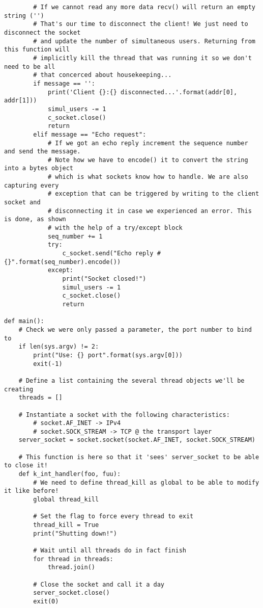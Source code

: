 \documentclass[landscape]{article}
\begin{document}
\begin{verbatim}
        # If we cannot read any more data recv() will return an empty string ('')
        # That's our time to disconnect the client! We just need to disconnect the socket
        # and update the number of simultaneous users. Returning from this function will
        # implicitly kill the thread that was running it so we don't need to be all
        # that concerced about housekeeping...
        if message == '':
            print('Client {}:{} disconnected...'.format(addr[0], addr[1]))
            simul_users -= 1
            c_socket.close()
            return
        elif message == "Echo request":
            # If we got an echo reply increment the sequence number and send the message.
            # Note how we have to encode() it to convert the string into a bytes object
            # which is what sockets know how to handle. We are also capturing every
            # exception that can be triggered by writing to the client socket and
            # disconnecting it in case we experienced an error. This is done, as shown
            # with the help of a try/except block
            seq_number += 1
            try:
                c_socket.send("Echo reply # {}".format(seq_number).encode())
            except:
                print("Socket closed!")
                simul_users -= 1
                c_socket.close()
                return

def main():
    # Check we were only passed a parameter, the port number to bind to
    if len(sys.argv) != 2:
        print("Use: {} port".format(sys.argv[0]))
        exit(-1)

    # Define a list containing the several thread objects we'll be creating
    threads = []

    # Instantiate a socket with the following characteristics:
        # socket.AF_INET -> IPv4
        # socket.SOCK_STREAM -> TCP @ the transport layer
    server_socket = socket.socket(socket.AF_INET, socket.SOCK_STREAM)

    # This function is here so that it 'sees' server_socket to be able to close it!
    def k_int_handler(foo, fuu):
        # We need to define thread_kill as global to be able to modify it like before!
        global thread_kill

        # Set the flag to force every thread to exit
        thread_kill = True
        print("Shutting down!")

        # Wait until all threads do in fact finish
        for thread in threads:
            thread.join()

        # Close the socket and call it a day
        server_socket.close()
        exit(0)


\end{verbatim}
\end{document}
